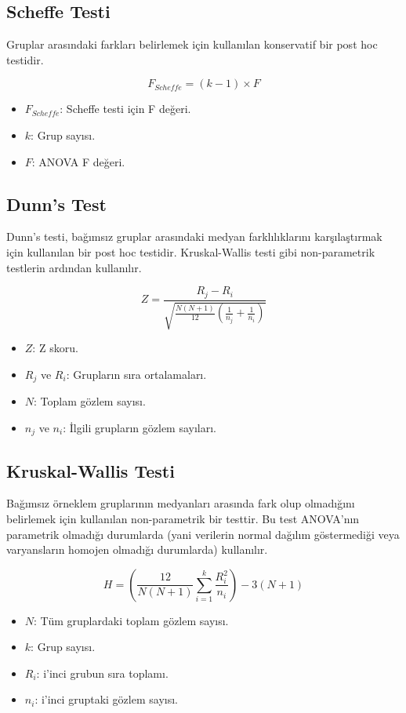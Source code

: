 \newpage

\subsection{Scheffe Testi}
Gruplar arasındaki farkları belirlemek için kullanılan konservatif bir post hoc testidir. 

\[ F_{Scheffe} = (k - 1) \times F \]

\begin{itemize}
	\item $F_{Scheffe}$: Scheffe testi için F değeri.
	\item $k$: Grup sayısı.
	\item $F$: ANOVA F değeri.
\end{itemize}

\newpage

\subsection{Dunn's Test}
Dunn's testi, bağımsız gruplar arasındaki medyan farklılıklarını karşılaştırmak için kullanılan bir post hoc testidir. Kruskal-Wallis testi gibi non-parametrik testlerin ardından kullanılır.

\[ Z = \frac{R_j - R_i}{\sqrt{\frac{N(N+1)}{12} \left(\frac{1}{n_j} + \frac{1}{n_i}\right)}} \]

\begin{itemize}
	\item $Z$: Z skoru.
	\item $R_j$ ve $R_i$: Grupların sıra ortalamaları.
	\item $N$: Toplam gözlem sayısı.
	\item $n_j$ ve $n_i$: İlgili grupların gözlem sayıları.
\end{itemize}

\newpage

\subsection{Kruskal-Wallis Testi}
Bağımsız örneklem gruplarının medyanları arasında fark olup olmadığını belirlemek için kullanılan non-parametrik bir testtir. Bu test ANOVA'nın parametrik olmadığı durumlarda (yani verilerin normal dağılım göstermediği veya varyansların homojen olmadığı durumlarda) kullanılır.

\[ H = \left( \frac{12}{N(N+1)} \sum_{i=1}^{k} \frac{R_i^2}{n_i} \right) - 3(N+1) \]

\begin{itemize}
	\item $N$: Tüm gruplardaki toplam gözlem sayısı.
	\item $k$: Grup sayısı.
	\item $R_i$: i'inci grubun sıra toplamı.
	\item $n_i$: i'inci gruptaki gözlem sayısı.
\end{itemize}

